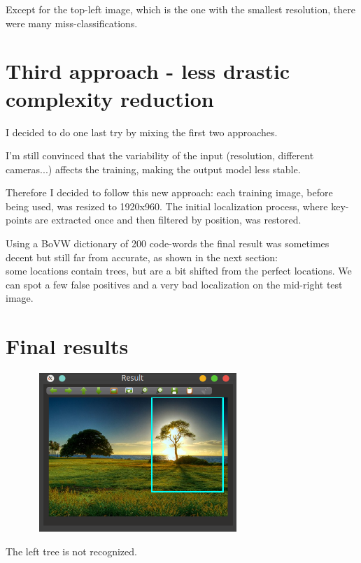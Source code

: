\documentclass[]{report}
\begin{document}
\vspace{0.5cm}

Except for the top-left image, which is the one with the smallest resolution, there were many miss-classifications.

\section{Third approach - less drastic complexity reduction}
I decided to do one last try by mixing the first two approaches.

I'm still convinced that the variability of the input (resolution, different cameras...) affects the training, making the output model less stable.

Therefore I decided to follow this new approach: each training image, before being used, was resized to 1920x960. The initial localization process, where key-points are extracted once and then filtered by position, was restored.

Using a BoVW dictionary of 200 code-words the final result was sometimes decent but still far from accurate, as shown in the next section:\\
some locations contain trees, but are a bit shifted from the perfect locations. We can spot a few false positives and a very bad localization on the mid-right test image.

\section{Final results}

\vspace{0.5cm}
\begin{center}
	\includegraphics[width=10cm,height=6cm]{img/final/0}
\end{center}
\vspace{0.5cm}

The left tree is not recognized.
\end{document}
